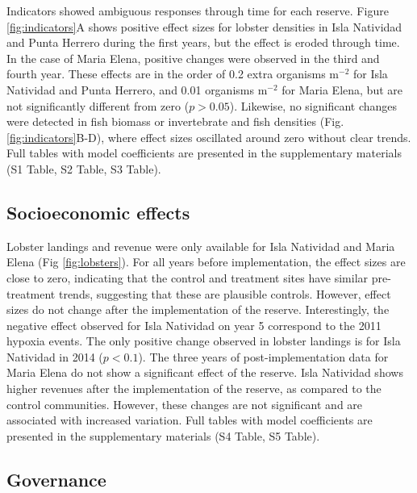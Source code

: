\documentclass{frontiersSCNS}
\begin{document}
Indicators showed ambiguous responses through time for each reserve.
Figure \ref{fig:indicators}A shows positive effect sizes for lobster
densities in Isla Natividad and Punta Herrero during the first years,
but the effect is eroded through time. In the case of Maria Elena,
positive changes were observed in the third and fourth year. These
effects are in the order of 0.2 extra organisms \(\mathrm{m}^{-2}\) for
Isla Natividad and Punta Herrero, and 0.01 organisms \(\mathrm{m}^{-2}\)
for Maria Elena, but are not significantly different from zero
(\(p > 0.05\)). Likewise, no significant changes were detected in fish
biomass or invertebrate and fish densities (Fig.
\ref{fig:indicators}B-D), where effect sizes oscillated around zero
without clear trends. Full tables with model coefficients are presented
in the supplementary materials (S1 Table, S2 Table, S3 Table).

\hypertarget{socioeconomic-effects}{%
\subsection{Socioeconomic effects}\label{socioeconomic-effects}}

Lobster landings and revenue were only available for Isla Natividad and
Maria Elena (Fig \ref{fig:lobsters}). For all years before
implementation, the effect sizes are close to zero, indicating that the
control and treatment sites have similar pre-treatment trends,
suggesting that these are plausible controls. However, effect sizes do
not change after the implementation of the reserve. Interestingly, the
negative effect observed for Isla Natividad on year 5 correspond to the
2011 hypoxia events. The only positive change observed in lobster
landings is for Isla Natividad in 2014 (\(p < 0.1\)). The three years of
post-implementation data for Maria Elena do not show a significant
effect of the reserve. Isla Natividad shows higher revenues after the
implementation of the reserve, as compared to the control communities.
However, these changes are not significant and are associated with
increased variation. Full tables with model coefficients are presented
in the supplementary materials (S4 Table, S5 Table).

\hypertarget{governance}{%
\subsection{Governance}\label{governance}}
\end{document}
